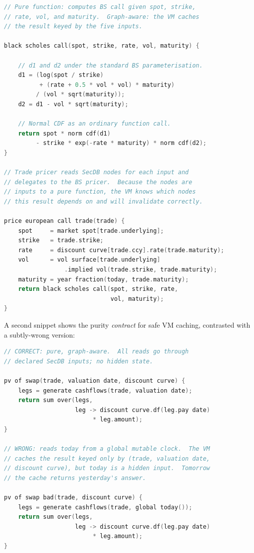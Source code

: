 \begin{lstlisting}[language=C, basicstyle=\ttfamily\small, frame=single, caption={Stylised Slang-like pricer for a European call (pseudocode)}]
// Pure function: computes BS call given spot, strike,
// rate, vol, and maturity.  Graph-aware: the VM caches
// the result keyed by the five inputs.

black scholes call(spot, strike, rate, vol, maturity) {

    // d1 and d2 under the standard BS parameterisation.
    d1 = (log(spot / strike)
          + (rate + 0.5 * vol * vol) * maturity)
         / (vol * sqrt(maturity));
    d2 = d1 - vol * sqrt(maturity);

    // Normal CDF as an ordinary function call.
    return spot * norm cdf(d1)
         - strike * exp(-rate * maturity) * norm cdf(d2);
}

// Trade pricer reads SecDB nodes for each input and
// delegates to the BS pricer.  Because the nodes are
// inputs to a pure function, the VM knows which nodes
// this result depends on and will invalidate correctly.

price european call trade(trade) {
    spot     = market spot[trade.underlying];
    strike   = trade.strike;
    rate     = discount curve[trade.ccy].rate(trade.maturity);
    vol      = vol surface[trade.underlying]
                 .implied vol(trade.strike, trade.maturity);
    maturity = year fraction(today, trade.maturity);
    return black scholes call(spot, strike, rate,
                              vol, maturity);
}
\end{lstlisting}

A second snippet shows the purity \emph{contract} for safe VM
caching, contrasted with a subtly-wrong version:

\begin{lstlisting}[language=C, basicstyle=\ttfamily\small, frame=single, caption={Pure vs impure: why the VM cache depends on purity}]
// CORRECT: pure, graph-aware.  All reads go through
// declared SecDB inputs; no hidden state.

pv of swap(trade, valuation date, discount curve) {
    legs = generate cashflows(trade, valuation date);
    return sum over(legs,
                    leg -> discount curve.df(leg.pay date)
                         * leg.amount);
}

// WRONG: reads today from a global mutable clock.  The VM
// caches the result keyed only by (trade, valuation date,
// discount curve), but today is a hidden input.  Tomorrow
// the cache returns yesterday's answer.

pv of swap bad(trade, discount curve) {
    legs = generate cashflows(trade, global today());
    return sum over(legs,
                    leg -> discount curve.df(leg.pay date)
                         * leg.amount);
}
\end{lstlisting}

